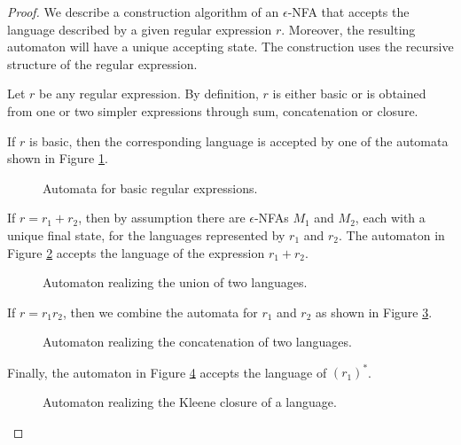 \begin{page}

\begin{proof}
We describe a construction algorithm of an $\epsilon$-NFA that accepts the language described by a given regular expression $r$.
Moreover, the resulting automaton will have a unique accepting state.
The construction uses the recursive structure of the regular expression.

Let $r$ be any regular expression.
By definition, $r$ is either basic or is obtained from one or two simpler expressions through sum, concatenation or closure.

If $r$ is basic, then the corresponding language is accepted by one of the automata shown in Figure \ref{fig:AutomBasicRegExpr}.

\begin{figure}[ht]
\begin{center}

\end{center}
\caption{Automata for basic regular expressions.}
\label{fig:AutomBasicRegExpr}
\end{figure}

If $r = r_1 + r_2$, then by assumption there are $\epsilon$-NFAs $M_1$ and $M_2$,
each with a unique final state, for the languages represented by $r_1$ and $r_2$.
The automaton in Figure \ref{fig:AutomSum} accepts the language of the expression $r_1 + r_2$.

\begin{figure}[ht]
\begin{center}

\end{center}
\caption{Automaton realizing the union of two languages.}
\label{fig:AutomSum}
\end{figure}

If $r = r_1r_2$, then we combine the automata for $r_1$ and $r_2$ as shown in Figure \ref{fig:AutomConcat}.

\begin{figure}[ht]
\begin{center}

\end{center}
\caption{Automaton realizing the concatenation of two languages.}
\label{fig:AutomConcat}
\end{figure}

Finally, the automaton in Figure \ref{fig:AutomClosure} accepts the language of $(r_1)^*$.

\begin{figure}[ht]
\begin{center}

\end{center}
\caption{Automaton realizing the Kleene closure of a language.}
\label{fig:AutomClosure}
\end{figure}


\end{proof}
\end{page}
